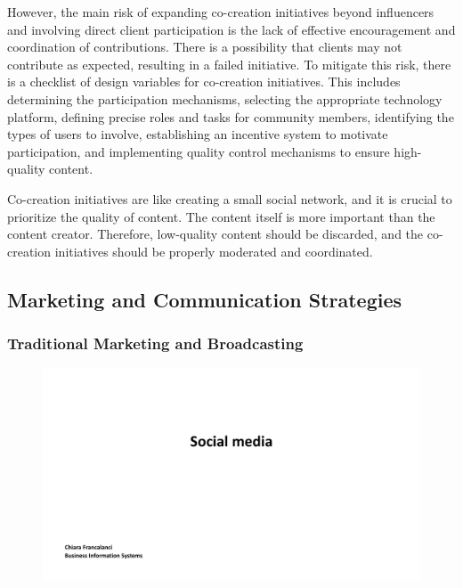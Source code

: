 However, the main risk of expanding co-creation initiatives beyond
influencers and involving direct client participation is the lack of
effective encouragement and coordination of contributions. There is a
possibility that clients may not contribute as expected, resulting in a
failed initiative. To mitigate this risk, there is a checklist of design
variables for co-creation initiatives. This includes determining the
participation mechanisms, selecting the appropriate technology platform,
defining precise roles and tasks for community members, identifying the
types of users to involve, establishing an incentive system to motivate
participation, and implementing quality control mechanisms to ensure
high-quality content.

Co-creation initiatives are like creating a small social network, and it
is crucial to prioritize the quality of content. The content itself is
more important than the content creator. Therefore, low-quality content
should be discarded, and the co-creation initiatives should be properly
moderated and coordinated.

\subsection{Marketing and Communication
    Strategies}\label{marketing-and-communication-strategies}

\subsubsection{Traditional Marketing and
    Broadcasting}\label{traditional-marketing-and-broadcasting}

\begin{figure}[!h]
    \centering
    \includegraphics[page=17, trim = 1.5cm 5cm 2.5cm 3cm, clip, width=\textwidth]{images/04 - Social_Media.pdf}
\end{figure}

